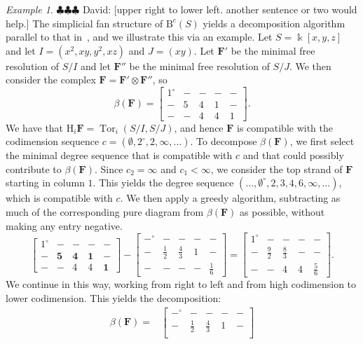 \documentclass[12pt]{amsart}
\theoremstyle{definition}
\theoremstyle{remark}
\newtheorem{example}[lemma]{Example}
\newcommand{\Tor}{\operatorname{Tor}}
\newcommand{\kk}{\Bbbk}
\newcommand{\HH}{\mathrm{H}}
\newcommand{\cc}{c}
\newcommand{\FF}{\mathbf{F}}
\newcommand{\zp}{\circ}
\newcommand{\BBQ}{\mathrm{B}}
\newcommand{\david}[1]{{\color{red} \sf $\clubsuit\clubsuit\clubsuit$ David: [#1]}}
\begin{document}
\begin{example}\label{example:greedy decomposition}\david{upper right to lower left. another sentence or two would help.}
The simplicial fan structure of $\BBQ^c(S)$ yields a decomposition algorithm parallel to that in~\cite[\S1]{eis-schrey1}, and we illustrate this via an example.  Let $S=\kk[x,y,z]$ and let $I=(x^2,xy,y^2,xz)$ and $J=(xy)$.  Let $\FF'$ be the minimal free resolution of $S/I$ and let $\FF''$ be the minimal free resolution of $S/J$.  We then consider the complex $\FF=\FF'\otimes \FF''$, so
\[
\beta(\FF)=
\begin{bmatrix}
1^\zp&-&-&-&-\\
-&{5}&{4}&{1}&-\\
-&-&4&4&{1}
\end{bmatrix}.
\]
We have that $\HH_i\FF=\Tor_i(S/I,S/J)$, and hence $\FF$ is compatible with the codimension sequence $\cc=(\emptyset, 2^\zp,2,\infty,\dots)$.    To decompose $\beta(\FF)$, we first select the minimal degree sequence that is compatible with $\cc$ and that could possibly contribute to $\beta(\FF)$.  Since $\cc_2=\infty$ and $\cc_1<\infty$, we consider the top strand of $\FF$ starting in column $1$.  This yields the degree sequence $(\dots,\emptyset^\zp,2,3,4,6,\infty,\dots)$, which is compatible with $\cc$.  We then apply a greedy algorithm, subtracting as much of the corresponding pure diagram from $\beta(\FF)$ as possible, without making any entry negative.
\[
\begin{bmatrix}
1^\zp&-&-&-&-\\
-&\mathbf{5}&\mathbf{4}&\mathbf{1}&-\\
-&-&4&4&\mathbf{1}
\end{bmatrix}
-
\begin{bmatrix}
-^\zp&-&-&-&-\\
-&\frac{1}{2}&\frac{4}{3}&1&-\\
-&-&-&-&\frac{1}{6}
\end{bmatrix}
=
\begin{bmatrix}
1^\zp&-&-&-&-\\
-&\frac{9}{2}&\frac{8}{3}&-&-\\
-&-&4&4&\frac{5}{6}
\end{bmatrix}.
\]
We continue in this way, working from right to left and from high codimension to lower codimension.  This yields the decomposition:
\begin{align*}
\beta(\FF)=&
\begin{bmatrix}
-^\zp&-&-&-&-\\
-&\frac{1}{2}&\frac{4}{3}&1&-\\

\end{bmatrix}
\end{align*}
\end{example}
\end{document}
